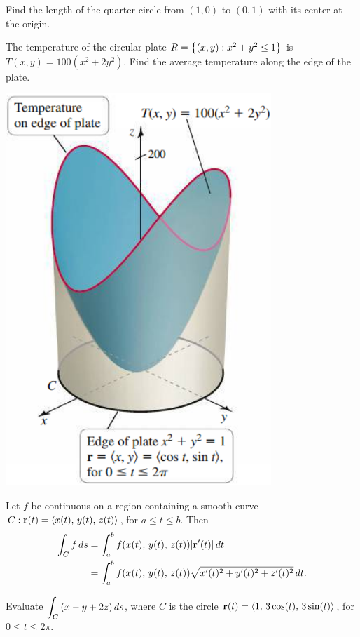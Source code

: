 \documentclass[../mathNotesPreamble]{subfiles}
\begin{document}
  \begin{ex*}
    Find the length of the quarter-circle from $(1,0)$ to $(0,1)$ with its center at the origin.
  \end{ex*}
  \pagebreak

  \begin{ex*}
    The temperature of the circular plate $R={\left\{(x,y): x^2+y^2\leq 1\right\}}$ is $T(x,y)=100(x^2+2y^2)$. Find the average temperature along the edge of the plate.
  \end{ex*}
  \begin{flushright}
    \includegraphics[width=0.35\linewidth]{../images/briggs_17_02/fig17_18}
  \end{flushright}
  \pagebreak


  \begin{thmBox*}
    Let $f$ be continuous on a region containing a smooth curve $C: {\mathbf{r}}(t)={\left\langle x(t),\,y(t),\,z(t) \right\rangle}$, for $a\leq t\leq b$. Then
    \begin{align*}
      \int_C f\,ds&= \int_a^b f{\left(x(t),\,y(t),\,z(t)\right)}{\left\vert{\mathbf{r}}'(t)\right\vert}\,dt\\
        &= \int_a^b  f{\left(x(t),\,y(t),\,z(t)\right)}\sqrt{x'(t)^2+y'(t)^2+z'(t)^2}\,dt.
    \end{align*}
  \end{thmBox*}

  \begin{ex*}
    Evaluate $\displaystyle \int_C {\left(x-y+2z\right)}\,ds$, where $C$ is the circle ${\mathbf{r}}(t)={\left\langle 1,\,3\cos(t),\,3\sin(t) \right\rangle}$, for $0\leq t\leq 2\pi$.
  \end{ex*}
  \pagebreak
\end{document}

